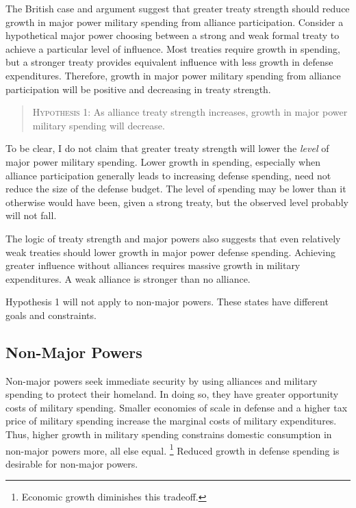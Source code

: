 \documentclass[12pt]{article}
\begin{document}
The British case and argument suggest that greater treaty strength should reduce growth in major power military spending from alliance participation.
Consider a hypothetical major power choosing between a strong and weak formal treaty to achieve a particular level of influence.  
Most treaties require growth in spending, but a stronger treaty provides equivalent influence with less growth in defense expenditures. 
Therefore, growth in major power military spending from alliance participation will be positive and decreasing in treaty strength. 


\begin{quote}
\textsc{Hypothesis 1}: As alliance treaty strength increases, growth in major power military spending will decrease. 
\end{quote}


To be clear, I do not claim that greater treaty strength will lower the \textit{level} of major power military spending. 
Lower growth in spending, especially when alliance participation generally leads to increasing defense spending, need not reduce the size of the defense budget. 
The level of spending may be lower than it otherwise would have been, given a strong treaty, but the observed level probably will not fall. 


The logic of treaty strength and major powers also suggests that even relatively weak treaties should lower growth in major power defense spending. 
Achieving greater influence without alliances requires massive growth in military expenditures. 
A weak alliance is stronger than no alliance. 


Hypothesis 1 will not apply to non-major powers. 
These states have different goals and constraints. 


\subsection{Non-Major Powers} 


Non-major powers seek immediate security by using alliances and military spending to protect their homeland.  
In doing so, they have greater opportunity costs of military spending. 
Smaller economies of scale in defense and a higher tax price of military spending increase the marginal costs of military expenditures. 
Thus, higher growth in military spending constrains domestic consumption in non-major powers more, all else equal.
\footnote{Economic growth diminishes this tradeoff.} 
Reduced growth in defense spending is desirable for non-major powers.
\end{document}
